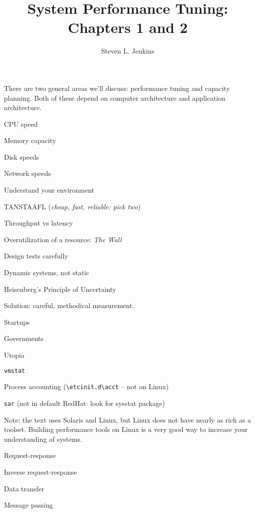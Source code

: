 \documentclass{slides}
\title{System Performance Tuning: Chapters 1 and 2}
\author{Steven L. Jenkins}
\begin{document}
\maketitle


There are two general areas we'll discuss: performance tuning and
capacity planning.  Both of these depend on computer architecture and
application architecture.

\bi
\item CPU speed
\item Memory capacity
\item Disk speeds
\item Network speeds
\ei



\be
\item Understand your environment
\item TANSTAAFL (\emph{cheap, fast, reliable: pick two})
\item Throughput vs latency
\item Overutilization of a resource: \emph{The Wall}
\item Design tests carefully
\ee



\bi
\item Dynamic systems, not static
\item Heisenberg's Principle of Uncertainty
\ei

Solution: careful, methodical measurement.


\bi
\item Startups
\item Governments
\item Utopia
\ei


\bi
\item {\tt vmstat}
\item Process accounting ({\tt \verb+\etcinit.d\acct+} -- not on Linux)
\item {\tt sar} (not in default RedHat: look for sysstat package)
\ei

Note: the text uses Solaris and Linux, but Linux does not have nearly
as rich as a toolset.  Building performance tools on Linux is a very
good way to increase your understanding of systems.


\bi
\item Request-response
\item Inverse request-response
\item Data transfer
\item Message passing
\ei
\end{document}
